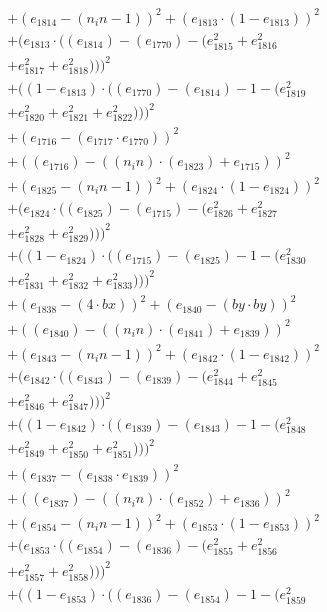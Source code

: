 \documentclass[10pt, a4paper]{article}
\begin{document}
\begin{align*}
& + (e_{1814} - (n_in - 1))^{2} + (e_{1813}  \cdot  (1 - e_{1813}))^{2} \\
& + (e_{1813}  \cdot  ((e_{1814}) - (e_{1770}) - (e_{1815}^{2} + e_{1816}^{2} \\
& + e_{1817}^{2} + e_{1818}^{2})))^{2} \\
& + ((1 - e_{1813})  \cdot  ((e_{1770}) - (e_{1814}) - 1 - (e_{1819}^{2} \\
& + e_{1820}^{2} + e_{1821}^{2} + e_{1822}^{2})))^{2} \\
& + (e_{1716} - (e_{1717}  \cdot  e_{1770}))^{2} \\
& + ((e_{1716}) - ((n_in)  \cdot  (e_{1823}) + e_{1715}))^{2} \\
& + (e_{1825} - (n_in - 1))^{2} + (e_{1824}  \cdot  (1 - e_{1824}))^{2} \\
& + (e_{1824}  \cdot  ((e_{1825}) - (e_{1715}) - (e_{1826}^{2} + e_{1827}^{2} \\
& + e_{1828}^{2} + e_{1829}^{2})))^{2} \\
& + ((1 - e_{1824})  \cdot  ((e_{1715}) - (e_{1825}) - 1 - (e_{1830}^{2} \\
& + e_{1831}^{2} + e_{1832}^{2} + e_{1833}^{2})))^{2} \\
& + (e_{1838} - (4  \cdot  bx))^{2} + (e_{1840} - (by  \cdot  by))^{2} \\
& + ((e_{1840}) - ((n_in)  \cdot  (e_{1841}) + e_{1839}))^{2} \\
& + (e_{1843} - (n_in - 1))^{2} + (e_{1842}  \cdot  (1 - e_{1842}))^{2} \\
& + (e_{1842}  \cdot  ((e_{1843}) - (e_{1839}) - (e_{1844}^{2} + e_{1845}^{2} \\
& + e_{1846}^{2} + e_{1847}^{2})))^{2} \\
& + ((1 - e_{1842})  \cdot  ((e_{1839}) - (e_{1843}) - 1 - (e_{1848}^{2} \\
& + e_{1849}^{2} + e_{1850}^{2} + e_{1851}^{2})))^{2} \\
& + (e_{1837} - (e_{1838}  \cdot  e_{1839}))^{2} \\
& + ((e_{1837}) - ((n_in)  \cdot  (e_{1852}) + e_{1836}))^{2} \\
& + (e_{1854} - (n_in - 1))^{2} + (e_{1853}  \cdot  (1 - e_{1853}))^{2} \\
& + (e_{1853}  \cdot  ((e_{1854}) - (e_{1836}) - (e_{1855}^{2} + e_{1856}^{2} \\
& + e_{1857}^{2} + e_{1858}^{2})))^{2} \\
& + ((1 - e_{1853})  \cdot  ((e_{1836}) - (e_{1854}) - 1 - (e_{1859}^{2} \\

\end{align*}
\end{document}
